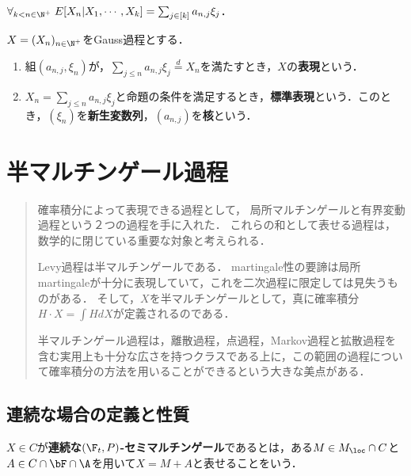 \documentclass[uplatex,dvipdfmx]{jsreport}
\begin{document}
\begin{proposition}
    $\forall_{k<n\in\N^+}\;E[X_n|X_1,\cdots,X_k]=\sum_{j\in[k]}a_{n,j}\xi_j$．
\end{proposition}

\begin{definition}
    $X=(X_n)_{n\in\N^+}$をGauss過程とする．
    \begin{enumerate}
        \item 組$(a_{n,j},\xi_n)$が，$\sum_{j\le n}a_{n,j}\xi_j\overset{d}{=}X_n$を満たすとき，$X$の\textbf{表現}という．
        \item $X_n=\sum_{j\le n}a_{n,j}\xi_j$と命題の条件を満足するとき，\textbf{標準表現}という．このとき，$(\xi_n)$を\textbf{新生変数列}，$(a_{n,j})$を\textbf{核}という．
    \end{enumerate}
\end{definition}

\chapter{半マルチンゲール過程}

\begin{quotation}
    確率積分によって表現できる過程として，
    局所マルチンゲールと有界変動過程という２つの過程を手に入れた．
    これらの和として表せる過程は，数学的に閉じている重要な対象と考えられる．

    Levy過程は半マルチンゲールである．
    martingale性の要諦は局所martingaleが十分に表現していて，これを二次過程に限定しては見失うものがある．
    そして，$X$を半マルチンゲールとして，真に確率積分$H\cdot X=\int HdX$が定義されるのである\cite{Liptser-Shiryaev-Statistics}．

    半マルチンゲール過程は，離散過程，点過程，Markov過程と拡散過程を含む実用上も十分な広さを持つクラスである上に，この範囲の過程について確率積分の方法を用いることができるという大きな美点がある\cite{Jacod-Shiryaev}．
\end{quotation}

\section{連続な場合の定義と性質}

\begin{definition}
    $X\in C$が\textbf{連続な$(\F_t,P)$-セミマルチンゲール}であるとは，ある$M\in M_\loc\cap C$と$A\in C\cap\bF\cap\A$を用いて$X=M+A$と表せることをいう．
\end{definition}
\end{document}

